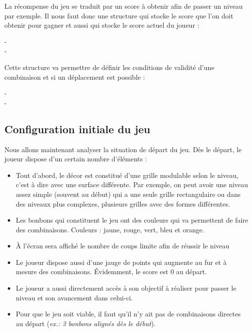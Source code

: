   La récompense du jeu se traduit par un score à obtenir afin de passer un niveau par exemple.
  Il nous faut donc une structure qui stocke le score que l'on doit obtenir pour gagner et aussi qui stocke le score actuel du joueur :
  
  \begin{typeag}[Score]
 -       \\
 -       
  \end{typeag}
  
  Cette structure va permettre de définir les conditions de validité d'une combinaison et si un déplacement est possible :
  
\begin{typeag}[Case]
 -       \\
 -       
  \end{typeag}

\subsection{Configuration initiale du jeu}
Nous allons maintenant analyser la situation de départ du jeu. Dès le départ, le joueur dispose d'un certain nombre d'éléments :

\begin{itemize}

\item
	Tout d'abord, le décor est constitué d'une grille modulable selon le niveau, c'est à dire avec une surface différente.
	Par exemple, on peut avoir une niveau assez simple (souvent au début) qui a une seule grille rectangulaire ou dans des niveaux plus complexes, plusieurs grilles avec des formes différentes.
\item
	Les bonbons qui constituent le jeu ont des couleurs qui va permettent de faire des combinaisons.
	Couleurs : jaune, rouge, vert, bleu et orange.
\item
	À l'écran sera affiché le nombre de coups limite afin de réussir le niveau %
\item
	Le joueur dispose aussi d'une jauge de points qui augmente au fur et à mesure des combinaisons.
	Évidemment, le score est 0 au départ.
\item
	Le joueur a aussi directement accès à son objectif à réaliser pour passer le niveau et son avancement dans celui-ci.
\item 
 	Pour que le jeu soit viable, il faut qu'il n'y ait pas de combinaisons directes au départ (\emph{ex.: 3 bonbons alignés dès le début}). %
	
\end{itemize}

